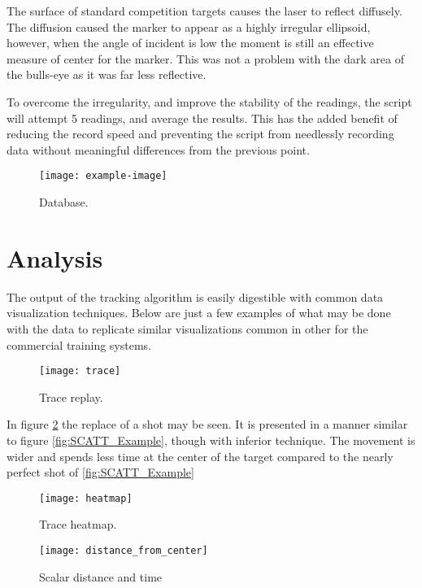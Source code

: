 \documentclass[conference]{IEEEtran}
\begin{document}
The surface of standard competition targets causes the laser to reflect diffusely.
The diffusion caused the marker to appear as a highly irregular ellipsoid,
however, when the angle of incident is low the moment is still an effective measure of center for the marker.
This was not a problem with the dark area of the bulls-eye as it was far less reflective.

To overcome the irregularity, and improve the stability of the readings, the script will attempt 5 readings, and average the results.
This has the added benefit of reducing the record speed and preventing the script from needlessly recording data without meaningful differences from the previous point.


\begin{figure}[h]
	\centering
	\texttt{[image: example-image]}
	\caption{Database.}
	\label{fig:database}
\end{figure}

\section{Analysis}

The output of the tracking algorithm is easily digestible with common data visualization techniques.
Below are just a few examples of what may be done with the data to replicate similar visualizations common in other for the commercial training systems.

\begin{figure}[h]
	\centering
	\texttt{[image: trace]}
	\caption{Trace replay.}
	\label{fig:trace}
\end{figure}

In figure \ref{fig:trace} the replace of a shot may be seen.
It is presented in a manner similar to figure \ref{fig:SCATT_Example}, 
though with inferior technique.
The movement is wider and spends less time at the center of the target compared to the nearly perfect shot of  \ref{fig:SCATT_Example}



\begin{figure}[h]
	\centering
	\texttt{[image: heatmap]}
	\caption{Trace heatmap.}
	\label{fig:heatmap}
\end{figure}

\begin{figure}[h]
	\centering
	\texttt{[image: distance\_from\_center]}
	\caption{Scalar distance and time}
	\label{fig:dfc}
\end{figure}
\end{document}
